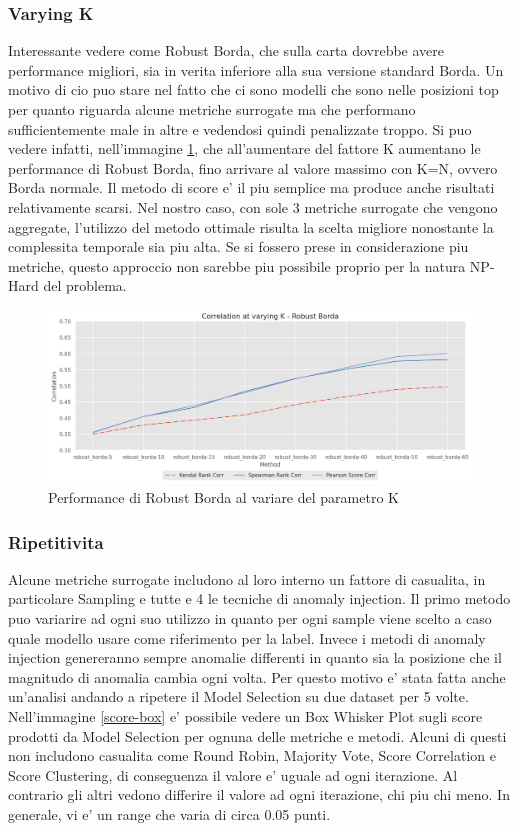 \newpage
\subsubsection{Varying K}
Interessante vedere come Robust Borda, che sulla carta dovrebbe avere performance migliori, sia in verita inferiore alla sua versione standard Borda. Un motivo di cio puo stare nel fatto che ci sono modelli che sono nelle posizioni top per quanto riguarda alcune metriche surrogate ma che performano sufficientemente male in altre e vedendosi quindi penalizzate troppo.
Si puo vedere infatti, nell'immagine \ref{varying-k}, che all'aumentare del fattore K aumentano le performance di Robust Borda, fino arrivare al valore massimo con K=N, ovvero Borda normale.
Il metodo di score e' il piu semplice ma produce anche risultati relativamente scarsi. Nel nostro caso, con sole 3 metriche surrogate che vengono aggregate, l'utilizzo del metodo ottimale risulta la scelta migliore nonostante la complessita temporale sia piu alta. Se si fossero prese in considerazione piu metriche, questo approccio non sarebbe piu possibile proprio per la natura NP-Hard del problema.

\begin{figure}[t]
\centering
	\includegraphics[width=14cm, scale=1]{images/varying-k}
    \caption{Performance di Robust Borda al variare del parametro K}
	\label{varying-k}
	
\end{figure}

\subsubsection{Ripetitivita}
Alcune metriche surrogate includono al loro interno un fattore di casualita, in particolare Sampling e tutte e 4 le tecniche di anomaly injection. Il primo metodo puo variarire ad ogni suo utilizzo in quanto per ogni sample viene scelto a caso quale modello usare come riferimento per la label. Invece i metodi di anomaly injection genereranno sempre anomalie differenti in quanto sia la posizione che il magnitudo di anomalia cambia ogni volta.
Per questo motivo e' stata fatta anche un'analisi andando a ripetere il Model Selection su due dataset per 5 volte.
Nell'immagine \ref{score-box}  e' possibile vedere un Box Whisker Plot sugli score prodotti da Model Selection per ognuna delle metriche e metodi. Alcuni di questi non includono casualita come Round Robin, Majority Vote, Score Correlation e Score Clustering, di conseguenza il valore e' uguale ad ogni iterazione. Al contrario gli altri vedono differire il valore ad ogni iterazione, chi piu chi meno. In generale, vi e' un range che varia di circa 0.05 punti.

